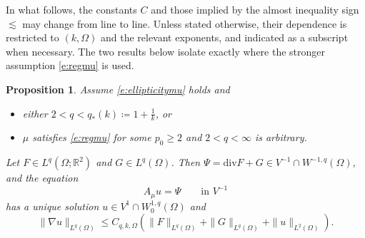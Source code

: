 \documentclass[12pt,leqno]{amsart}
\def\R {\mathbb{R}}
\newtheorem{proposition}[theorem]{Proposition}
\theoremstyle{definition}
\numberwithin{equation}{section}
\numberwithin{figure}{section}
\begin{document}
In what follows, the constants $C$ and those implied by the almost inequality sign $\lesssim $ may change from line to line.
Unless stated otherwise, their dependence is restricted to $(k,\Omega)$ and the
relevant exponents, and indicated as a subscript when necessary. The two results below isolate exactly where the stronger
assumption \eqref{e:regmu} is used. 

\begin{proposition} \label{prop:beltrami-W1q}
  Assume \eqref{e:ellipticitymu} holds and 
\begin{itemize}
\item[\textup{(i)}] either $2<q< q_\ast(k)\coloneqq 1+\frac1k $, or
\item[\textup{(ii)}] $\mu$ satisfies \eqref{e:regmu} for some $p_0\ge2$  and $2<q<\infty$ is arbitrary.
\end{itemize}
Let $F\in L^{q}(\Omega;\R^{2})$ and $G\in L^{q}(\Omega)$. Then $\Psi= \mathrm{div}F+G \in V^{-1}\cap W^{-1,q}(\Omega)$, and the equation
\begin{equation}\label{eq:A-div-FG}
A_{\mu}u=\Psi\qquad \text{in }V^{-1}
\end{equation}
has a unique solution $u\in V^1 \cap  W^{1,q}_{0}(\Omega) $ and
\begin{equation}\label{eq:W1q-toolbox}
\|\nabla u\|_{L^{q}(\Omega)}
\le C_{q,k,\Omega}
\left(\|F\|_{L^{q}(\Omega)}+\|G\|_{L^{q}(\Omega)}+\|u\|_{L^{2}(\Omega)}\right).
\end{equation}
 \end{proposition}
\end{document}
